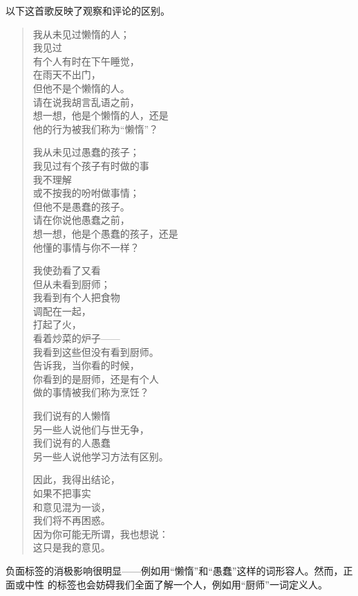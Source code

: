 \documentclass{ctexart}
\newcommand{\person}[1]{%
\nopagebreak{\raggedleft\small ------#1\par}}
\begin{document}
以下这首歌反映了观察和评论的区别。

\begin{verse}
	我从未见过懒惰的人；\\
	我见过\\
	有个人有时在下午睡觉，\\
	在雨天不出门，\\
	但他不是个懒惰的人。\\
	请在说我胡言乱语之前，\\
	想一想，他是个懒惰的人，还是\\
	他的行为被我们称为``懒惰''？

	我从未见过愚蠢的孩子；\\
	我见过有个孩子有时做的事\\
	我不理解\\
	或不按我的吩咐做事情；\\
	但他不是愚蠢的孩子。\\
	请在你说他愚蠢之前，\\
	想一想，他是个愚蠢的孩子，还是\\
	他懂的事情与你不一样？

	我使劲看了又看\\
	但从未看到厨师；\\
	我看到有个人把食物\\
	调配在一起，\\
	打起了火，\\
	看着炒菜的炉子------\\
	我看到这些但没有看到厨师。\\
	告诉我，当你看的时候，\\
	你看到的是厨师，还是有个人\\
	做的事情被我们称为烹饪？

	我们说有的人懒惰\\
	另一些人说他们与世无争，\\
	我们说有的人愚蠢\\
	另一些人说他学习方法有区别。

	因此，我得出结论，\\
	如果不把事实\\
	和意见混为一谈，\\
	我们将不再困惑。\\
	因为你可能无所谓，我也想说：\\
	这只是我的意见。\\

	\person{鲁思·贝本梅尔}
\end{verse}

负面标签的消极影响很明显------例如用``懒惰''和``愚蠢''这样的词形容人。然而，正面或中性
的标签也会妨碍我们全面了解一个人，例如用``厨师''一词定义人。
\end{document}
